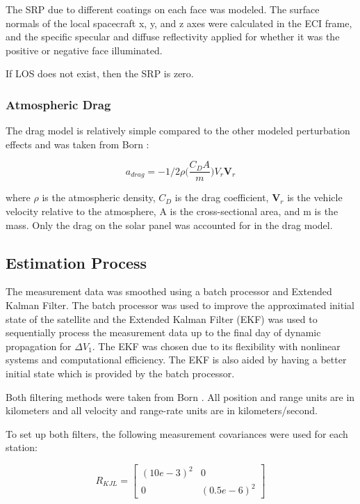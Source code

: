 \documentclass[conf]{new-aiaa}
\begin{document}
The SRP due to different coatings on each face was modeled. The surface normals of the local spacecraft x, y, and z axes were calculated in the ECI frame, and the specific specular and diffuse reflectivity applied for whether it was the positive or negative face illuminated. 

If LOS does not exist, then the SRP is zero. 

\subsubsection{Atmospheric Drag}

The drag model is relatively simple compared to the other modeled perturbation effects and was taken from Born \cite{born_statorbitdet}: 

\begin{equation}
	a_{drag} = -1/2 \rho \big( \dfrac{C_D A}{m} \big) V_r \pmb{V}_r
\end{equation}

where $\rho$ is the atmospheric density, $C_D$ is the drag coefficient, $\pmb{V}_r$ is the vehicle velocity relative to the atmosphere, A is the cross-sectional area, and m is the mass. Only the drag on the solar panel was accounted for in the drag model. 

\subsection{Estimation Process}

The measurement data was smoothed using a batch processor and Extended Kalman Filter. The batch processor was used to improve the approximated initial state of the satellite and the Extended Kalman Filter (EKF) was used to sequentially process the measurement data up to the final day of dynamic propagation for $\Delta V_1$. The EKF was chosen due to its flexibility with nonlinear systems and computational efficiency. The EKF is also aided by having a better initial state which is provided by the batch processor. 

Both filtering methods were taken from Born \cite{born_statorbitdet}. All position and range units are in kilometers and all velocity and range-rate units are in kilometers/second. 

To set up both filters, the following measurement covariances were used for each station: 

\begin{equation}
	R_{KJL} = 
	\begin{bmatrix}
		(10e-3)^2 & 0 \\ 
		0 & (0.5e-6)^2
	\end{bmatrix}
\end{equation}
\end{document}
